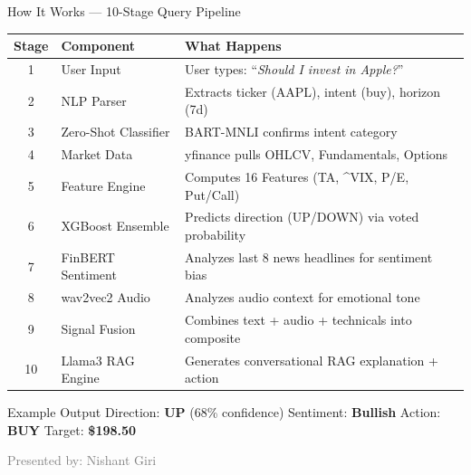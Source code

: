 \documentclass[aspectratio=169, 11pt]{beamer}
\begin{document}
\begin{frame}{How It Works --- 10-Stage Query Pipeline}

\begin{center}
\small
\renewcommand{\arraystretch}{1.15}
\begin{tabular}{c l l}
\toprule
\textbf{Stage} & \textbf{Component} & \textbf{What Happens} \\
\midrule
1 & User Input & User types: ``\textit{Should I invest in Apple?}'' \\
2 & NLP Parser & Extracts ticker (AAPL), intent (buy), horizon (7d) \\
3 & Zero-Shot Classifier & BART-MNLI confirms intent category \\
4 & Market Data & yfinance pulls OHLCV, Fundamentals, Options \\
5 & Feature Engine & Computes 16 Features (TA, ^VIX, P/E, Put/Call) \\
6 & XGBoost Ensemble & Predicts direction (UP/DOWN) via voted probability \\
7 & FinBERT Sentiment & Analyzes last 8 news headlines for sentiment bias \\
8 & wav2vec2 Audio & Analyzes audio context for emotional tone \\
9 & Signal Fusion & Combines text + audio + technicals into composite \\
10 & Llama3 RAG Engine& Generates conversational RAG explanation + action \\
\bottomrule
\end{tabular}
\end{center}

\vspace{0.2cm}
\begin{block}{Example Output}
Direction: \textbf{UP} (68\% confidence) \quad Sentiment: \textbf{Bullish} \quad Action: \textbf{BUY} \quad Target: \textbf{\$198.50}
\end{block}
\vfill
{\tiny\textcolor{gray}{Presented by: Nishant Giri}}
\end{frame}
\end{document}
